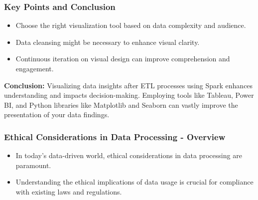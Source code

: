 \documentclass[aspectratio=169]{beamer}
\begin{document}
\begin{frame}[fragile]
    \frametitle{Key Points and Conclusion}
    \begin{itemize}
        \item Choose the right visualization tool based on data complexity and audience.
        \item Data cleansing might be necessary to enhance visual clarity.
        \item Continuous iteration on visual design can improve comprehension and engagement.
    \end{itemize}
    
    \textbf{Conclusion:} 
    Visualizing data insights after ETL processes using Spark enhances understanding and impacts decision-making. Employing tools like Tableau, Power BI, and Python libraries like Matplotlib and Seaborn can vastly improve the presentation of your data findings.
\end{frame}

\begin{frame}[fragile]
    \frametitle{Ethical Considerations in Data Processing - Overview}
    \begin{itemize}
        \item In today's data-driven world, ethical considerations in data processing are paramount.
        \item Understanding the ethical implications of data usage is crucial for compliance with existing laws and regulations.
    \end{itemize}
\end{frame}
\end{document}
